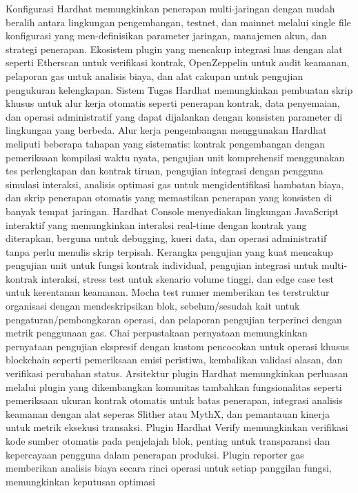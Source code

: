 Konfigurasi Hardhat memungkinkan penerapan multi-jaringan dengan mudah beralih
antara lingkungan pengembangan, testnet, dan mainnet melalui single file
konfigurasi yang men-definisikan parameter jaringan, manajemen akun, dan
strategi penerapan. Ekosistem plugin yang mencakup integrasi luas dengan alat
seperti Etherscan untuk verifikasi kontrak, OpenZeppelin untuk audit keamanan,
pelaporan gas untuk analisis biaya, dan alat cakupan untuk pengujian pengukuran
kelengkapan. Sistem Tugas Hardhat memungkinkan pembuatan skrip khusus untuk
alur kerja otomatis seperti penerapan kontrak, data penyemaian, dan operasi
administratif yang dapat dijalankan dengan konsisten parameter di lingkungan
yang berbeda. Alur kerja pengembangan menggunakan Hardhat meliputi beberapa
tahapan yang sistematis: kontrak pengembangan dengan pemeriksaan kompilasi
waktu nyata, pengujian unit komprehensif menggunakan tes perlengkapan dan
kontrak tiruan, pengujian integrasi dengan pengguna simulasi interaksi,
analisis optimasi gas untuk mengidentifikasi hambatan biaya, dan skrip
penerapan otomatis yang memastikan penerapan yang konsisten di banyak tempat
jaringan. Hardhat Console menyediakan lingkungan JavaScript interaktif yang
memungkinkan interaksi real-time dengan kontrak yang diterapkan, berguna untuk
debugging, kueri data, dan operasi administratif tanpa perlu menulis skrip
terpisah. Kerangka pengujian yang kuat mencakup pengujian unit untuk fungsi
kontrak individual, pengujian integrasi untuk multi-kontrak interaksi, stress
test untuk skenario volume tinggi, dan edge case test untuk kerentanan
keamanan. Mocha test runner memberikan tes terstruktur organisasi dengan
mendeskripsikan blok, sebelum/sesudah kait untuk pengaturan/pembongkaran
operasi, dan pelaporan pengujian terperinci dengan metrik penggunaan gas. Chai
perpustakaan pernyataan memungkinkan pernyataan pengujian ekspresif dengan
kustom pencocokan untuk operasi khusus blockchain seperti pemeriksaan emisi
peristiwa, kembalikan validasi alasan, dan verifikasi perubahan status.
Arsitektur plugin Hardhat memungkinkan perluasan melalui plugin yang
dikembangkan komunitas tambahkan fungsionalitas seperti pemeriksaan ukuran
kontrak otomatis untuk batas penerapan, integrasi analisis keamanan dengan alat
seperas Slither atau MythX, dan pemantauan kinerja untuk metrik eksekusi
transaksi. Plugin Hardhat Verify memungkinkan verifikasi kode sumber otomatis
pada penjelajah blok, penting untuk transparansi dan kepercayaan pengguna dalam
penerapan produksi. Plugin reporter gas memberikan analisis biaya secara rinci
operasi untuk setiap panggilan fungsi, memungkinkan keputusan optimasi
